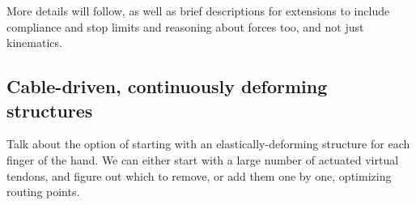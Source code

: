 More details will follow, as well as brief descriptions for extensions to include compliance and stop limits and reasoning about forces too, and not just kinematics.


\subsection{Cable-driven, continuously deforming structures}

Talk about the option of starting with an elastically-deforming structure for each finger of the hand. We can either start with a large number of actuated virtual tendons, and figure out which to remove, or add them one by one, optimizing routing points.
